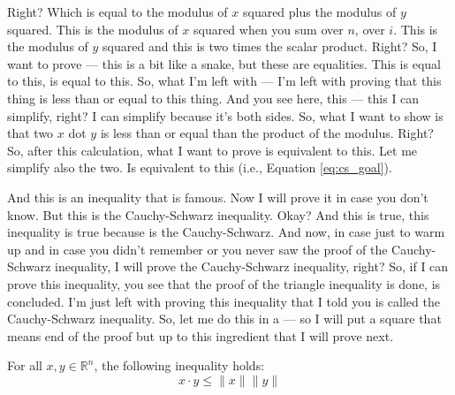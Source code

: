 \begin{spoken-clean}[00:03:28 - 00:05:50]
Right? Which is equal to the modulus of $x$ squared plus the modulus of $y$ squared. This is the modulus of $x$ squared when you sum over $n$, over $i$. This is the modulus of $y$ squared and this is two times the scalar product. Right? So, I want to prove --- this is a bit like a snake, but these are equalities. This is equal to this, is equal to this. So, what I'm left with --- I'm left with proving that this thing is less than or equal to this thing. And you see here, this --- this I can simplify, right? I can simplify because it's both sides. So, what I want to show is that two $x$ dot $y$ is less than or equal than the product of the modulus. Right? So, after this calculation, what I want to prove is equivalent to this. Let me simplify also the two. Is equivalent to this (i.e., Equation \ref{eq:cs_goal}).

And this is an inequality that is famous. Now I will prove it in case you don't know. But this is the Cauchy-Schwarz inequality. Okay? And this is true, this inequality is true because is the Cauchy-Schwarz.  And now, in case just to warm up and in case you didn't remember or you never saw the proof of the Cauchy-Schwarz inequality, I will prove the Cauchy-Schwarz inequality, right? So, if I can prove this inequality, you see that the proof of the triangle inequality is done, is concluded. I'm just left with proving this inequality that I told you is called the Cauchy-Schwarz inequality. So, let me do this in a --- so I will put a square that means end of the proof but up to this ingredient that I will prove next.
\end{spoken-clean}

\begin{nice-box}
\begin{lemma} \label{lem:cauchy_schwarz}
For all $x, y \in \mathbb{R}^n$, the following inequality holds:
\begin{equation} \label{eq:cauchy_schwarz}
x \cdot y \le \|x\|\|y\|
\end{equation}
\end{lemma}
\end{nice-box}

